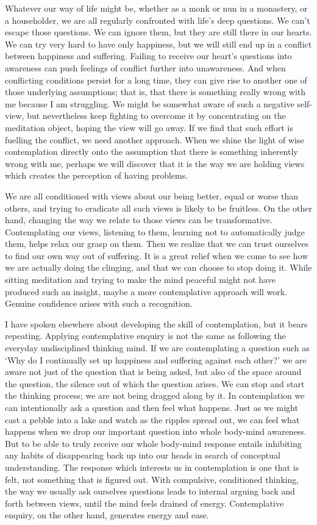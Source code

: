 Whatever our way of life might be, whether as a monk or nun in a
monastery, or a householder, we are all regularly confronted with life’s
deep questions. We can’t escape those questions. We can ignore them, but
they are still there in our hearts. We can try very hard to have only
happiness, but we will still end up in a conflict between happiness and
suffering. Failing to receive our heart’s questions into awareness can
push feelings of conflict further into unawareness. And when conflicting
conditions persist for a long time, they can give rise to another one of
those underlying assumptions; that is, that there is something really
wrong with me because I am struggling. We might be somewhat aware of
such a negative self-view, but nevertheless keep fighting to overcome it
by concentrating on the meditation object, hoping the view will go away.
If we find that such effort is fuelling the conflict, we need another
approach. When we shine the light of wise contemplation directly onto
the assumption that there is something inherently wrong with me, perhaps
we will discover that it is the way we are holding views which creates
the perception of having problems.

We are all conditioned with views about our being better, equal or worse
than others, and trying to eradicate all such views is likely to be
fruitless. On the other hand, changing the way we relate to those views
can be transformative. Contemplating our views, listening to them,
learning not to automatically judge them, helps relax our grasp on them.
Then we realize that we can trust ourselves to find our own way out of
suffering. It is a great relief when we come to see how we are actually
doing the clinging, and that we can choose to stop doing it. While
sitting meditation and trying to make the mind peaceful might not have
produced such an insight, maybe a more contemplative approach will work.
Genuine confidence arises with such a recognition.

I have spoken elsewhere about developing the skill of contemplation, but
it bears repeating. Applying contemplative enquiry is not the same as
following the everyday undisciplined thinking mind. If we are
contemplating a question such as ‘Why do I continually set up happiness
and suffering against each other?’ we are aware not just of the question
that is being asked, but also of the space around the question, the
silence out of which the question arises. We can stop and start the
thinking process; we are not being dragged along by it. In contemplation
we can intentionally ask a question and then feel what happens. Just as
we might cast a pebble into a lake and watch as the ripples spread out,
we can feel what happens when we drop our important question into whole
body-mind awareness. But to be able to truly receive our whole body-mind
response entails inhibiting any habits of disappearing back up into our
heads in search of conceptual understanding. The response which
interests us in contemplation is one that is felt, not something that is
figured out. With compulsive, conditioned thinking, the way we usually
ask ourselves questions leads to internal arguing back and forth between
views, until the mind feels drained of energy. Contemplative enquiry, on
the other hand, generates energy and ease.

